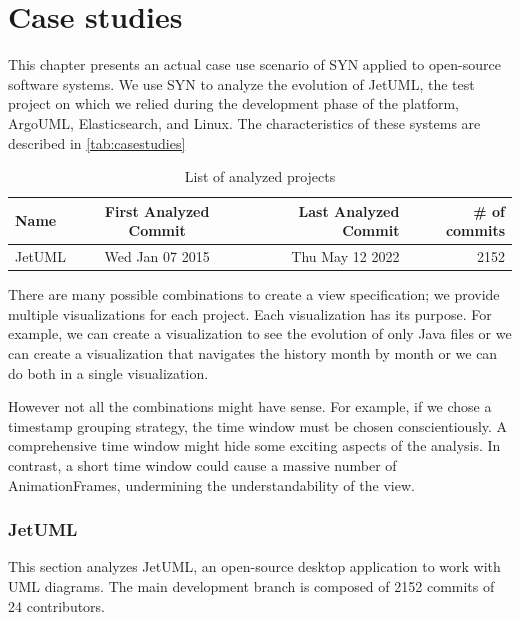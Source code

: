 
\chapter[Case studies]{Case studies}
\graphicspath{ {images/casestudies} }

This chapter presents an actual case use scenario of SYN applied to open-source software systems. 
We use SYN to analyze the evolution of JetUML, the test project on which we relied during the development phase of the platform, ArgoUML, Elasticsearch, and Linux. 
The characteristics of these systems are described in \autoref{tab:casestudies}

\begin{table}[ht]
    \centering
    \begin{tabular}{lcrr} 
        \hline
        {\bf Name} & {\bf First Analyzed Commit} & {\bf Last Analyzed Commit} & {\bf \# of commits}\\ 
        \hline
        JetUML & Wed Jan 07 2015 &  Thu May 12 2022  &  2152  
    \end{tabular}
    \caption{List of analyzed projects}
    \label{tab:casestudies}
\end{table}

\bigbreak
There are many possible combinations to create a view specification; we provide multiple visualizations for each project. 
Each visualization has its purpose. For example, we can create a visualization to see the evolution of only Java files or we can create a visualization that navigates the history month by month or we can do both in a single visualization. 

However not all the combinations might have sense. For example, if we chose a timestamp grouping strategy, the time window must be chosen conscientiously. 
A comprehensive time window might hide some exciting aspects of the analysis. In contrast, a short time window could cause a massive number of AnimationFrames, undermining the understandability of the view. 


\subsection*{JetUML}
This section analyzes JetUML, an open-source desktop application to work with UML diagrams.
The main development branch is composed of 2152 commits of 24 contributors. 

